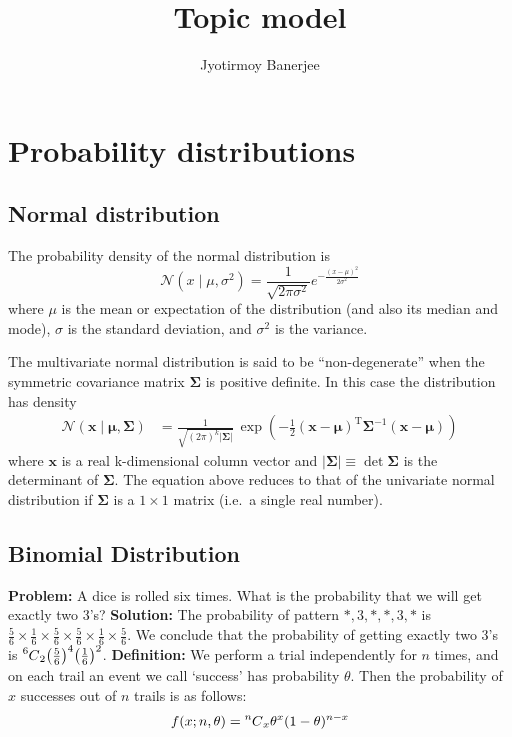 \documentclass{article}
\title{Topic model}
\author{Jyotirmoy Banerjee}
\newcommand\Mycomb[2][^n]{\prescript{#1\mkern-0.5mu}{}C_{#2}}
\begin{document}
\maketitle


\section{Probability distributions}
\subsection{Normal distribution}
The probability density of the normal distribution is
\[\displaystyle \mathcal{N}(x\mid \mu ,\sigma ^{2})={\frac {1}{\sqrt {2\pi \sigma ^{2}}}}e^{-{\frac {(x-\mu )^{2}}{2\sigma ^{2}}}}\]
where $\mu$ is the mean or expectation of the distribution (and also its median and mode), $\sigma$ is the standard deviation, and $\sigma^{2}$ is the variance.

The multivariate normal distribution is said to be ``non-degenerate'' when the symmetric covariance matrix $\boldsymbol {\Sigma }$ is positive definite. In this case the distribution has density
\begin{align*}
\mathcal{N}(\mathbf {x} \mid \boldsymbol {\mu }, \boldsymbol {\Sigma })&={\frac{1}{\sqrt {(2\pi )^{k}|{\boldsymbol {\Sigma }}|}} \, {\exp \left(-{\frac {1}{2}}({\mathbf {x} }-{\boldsymbol {\mu }})^{\mathrm {T} }{\boldsymbol {\Sigma }}^{-1}({\mathbf {x} }-{\boldsymbol {\mu }})\right)}}
\end{align*}
where $\mathbf {x}$ is a real k-dimensional column vector and $|{\boldsymbol {\Sigma }}|\equiv \operatorname {det} {\boldsymbol {\Sigma }}$ is the determinant of ${\boldsymbol {\Sigma }}$. 
The equation above reduces to that of the univariate normal distribution if ${\boldsymbol {\Sigma }}$ is a $1\times 1$ matrix (i.e.\ a single real number). 

\subsection{Binomial Distribution}
\textbf{Problem:} A dice is rolled six times. What is the probability that we will get exactly two 3's? \newline
\textbf{Solution:} The probability of pattern $*,3,*,*,3,*$ is $\frac{5}{6}\times\frac{1}{6}\times\frac{5}{6}\times\frac{5}{6}\times\frac{1}{6}\times\frac{5}{6}$. We conclude that the probability of getting exactly two 3's is $\Mycomb[6]{2}\big(\frac{5}{6}\big)^4\big(\frac{1}{6}\big)^2$. \newline
\textbf{Definition:} We perform a trial independently for $n$ times, and on each trail an event we call `success' has probability $\theta$. Then the probability of $x$ successes out of $n$ trails is as follows:
\[f(x;n,\theta) = \Mycomb[n]{x}{\theta}^x(1-{\theta})^{n-x}\]
\end{document}
